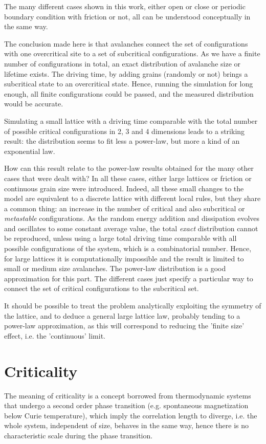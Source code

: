 The many different cases shown in this work, either open or close or periodic boundary condition with friction or not, all can be understood conceptually in the same way.

The conclusion made here is that avalanches connect the set of configurations with one overcritical site to a set of subcritical configurations. As we have a finite number of configurations in total, an exact distribution of avalanche size or lifetime exists. The driving time, by adding grains (randomly or not) brings a subcritical state to an overcritical state. Hence, running the simulation for long enough, all finite configurations could be passed, and the measured distribution would be accurate.

Simulating a small lattice with a driving time comparable with the total number of possible critical configurations in 2, 3 and 4 dimensions leads to a striking result: the distribution seems to fit less a power-law, but more a kind of an exponential law.

How can this result relate to the power-law results obtained for the many other cases that were dealt with? In all these cases, either large lattices or friction or continuous grain size were introduced. Indeed, all these small changes to the model are equivalent to a discrete lattice with different local rules, but they share a common thing: an increase in the number of critical and also subcritical or \emph{metastable} configurations. As the random energy addition and dissipation evolves and oscillates to some constant average value, the total \emph{exact} distribution cannot be reproduced, unless using a large total driving time comparable with all possible configurations of the system, which is a combinatorial number. Hence, for large lattices it is computationally impossible and the result is limited to small or medium size avalanches. The power-law distribution is a good approximation for this part. The different cases just specify a particular way to connect the set of critical configurations to the subcritical set.

It should be possible to treat the problem analytically exploiting the symmetry of the lattice, and to deduce a general large lattice law, probably tending to a power-law approximation, as this will correspond to reducing the 'finite size' effect, i.e. the 'continuous' limit. 

\section{Criticality}
The meaning of criticality is a concept borrowed from thermodynamic systems that undergo a second order phase transition (e.g. spontaneous magnetization below Curie temperature), which imply the correlation length to diverge, i.e. the whole system, independent of size, behaves in the same way, hence there is no characteristic scale during the phase transition.

